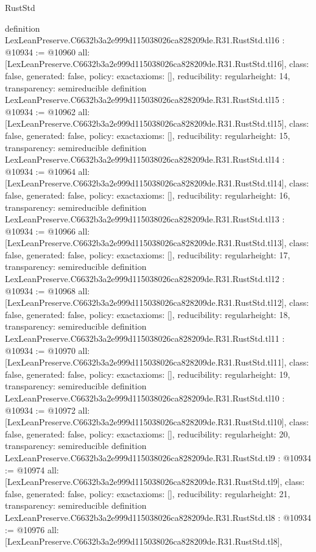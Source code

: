 \begin{lexlean}{RustStd}
\begin{coremodule}
{}
definition LexLeanPreserve.C6632b3a2e999d115038026ca828209de.R31.RustStd.tl16 : @10934 := @10960 {
  all: [LexLeanPreserve.C6632b3a2e999d115038026ca828209de.R31.RustStd.tl16],
  class: false,
  generated: false,
  policy: exact{axioms: []},
  reducibility: regular{height: 14},
  transparency: semireducible
}
definition LexLeanPreserve.C6632b3a2e999d115038026ca828209de.R31.RustStd.tl15 : @10934 := @10962 {
  all: [LexLeanPreserve.C6632b3a2e999d115038026ca828209de.R31.RustStd.tl15],
  class: false,
  generated: false,
  policy: exact{axioms: []},
  reducibility: regular{height: 15},
  transparency: semireducible
}
definition LexLeanPreserve.C6632b3a2e999d115038026ca828209de.R31.RustStd.tl14 : @10934 := @10964 {
  all: [LexLeanPreserve.C6632b3a2e999d115038026ca828209de.R31.RustStd.tl14],
  class: false,
  generated: false,
  policy: exact{axioms: []},
  reducibility: regular{height: 16},
  transparency: semireducible
}
definition LexLeanPreserve.C6632b3a2e999d115038026ca828209de.R31.RustStd.tl13 : @10934 := @10966 {
  all: [LexLeanPreserve.C6632b3a2e999d115038026ca828209de.R31.RustStd.tl13],
  class: false,
  generated: false,
  policy: exact{axioms: []},
  reducibility: regular{height: 17},
  transparency: semireducible
}
definition LexLeanPreserve.C6632b3a2e999d115038026ca828209de.R31.RustStd.tl12 : @10934 := @10968 {
  all: [LexLeanPreserve.C6632b3a2e999d115038026ca828209de.R31.RustStd.tl12],
  class: false,
  generated: false,
  policy: exact{axioms: []},
  reducibility: regular{height: 18},
  transparency: semireducible
}
definition LexLeanPreserve.C6632b3a2e999d115038026ca828209de.R31.RustStd.tl11 : @10934 := @10970 {
  all: [LexLeanPreserve.C6632b3a2e999d115038026ca828209de.R31.RustStd.tl11],
  class: false,
  generated: false,
  policy: exact{axioms: []},
  reducibility: regular{height: 19},
  transparency: semireducible
}
definition LexLeanPreserve.C6632b3a2e999d115038026ca828209de.R31.RustStd.tl10 : @10934 := @10972 {
  all: [LexLeanPreserve.C6632b3a2e999d115038026ca828209de.R31.RustStd.tl10],
  class: false,
  generated: false,
  policy: exact{axioms: []},
  reducibility: regular{height: 20},
  transparency: semireducible
}
definition LexLeanPreserve.C6632b3a2e999d115038026ca828209de.R31.RustStd.tl9 : @10934 := @10974 {
  all: [LexLeanPreserve.C6632b3a2e999d115038026ca828209de.R31.RustStd.tl9],
  class: false,
  generated: false,
  policy: exact{axioms: []},
  reducibility: regular{height: 21},
  transparency: semireducible
}
definition LexLeanPreserve.C6632b3a2e999d115038026ca828209de.R31.RustStd.tl8 : @10934 := @10976 {
  all: [LexLeanPreserve.C6632b3a2e999d115038026ca828209de.R31.RustStd.tl8],
}
\end{coremodule}
\end{lexlean}
